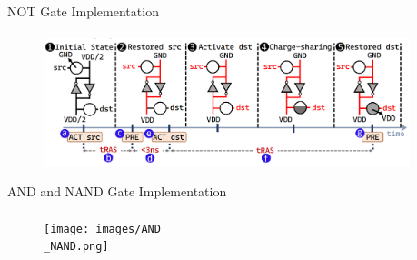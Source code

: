 \documentclass{beamer}
\begin{document}
\begin{frame}[t]{NOT Gate Implementation}
\framesubtitle{}
\begin{figure}
	\centering
		\includegraphics[width=0.95\textwidth]{images/NOT.png}
	\caption{}
	\label{fig:NOT}
\end{figure}
\end{frame}

\begin{frame}[t]{AND and NAND Gate Implementation}
\framesubtitle{}

\begin{figure}
	\centering
		\texttt{[image: images/AND\\\_NAND.png]}
	\caption{}
	\label{fig:NOT}
\end{figure}

\end{frame}


\end{document}
